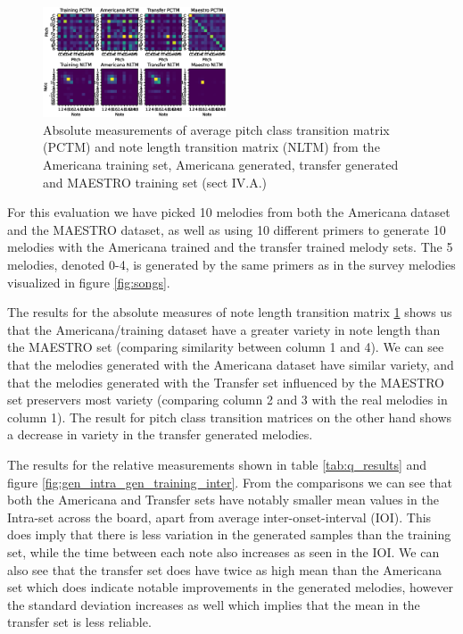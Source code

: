 \documentclass{IEEEtran}
\begin{document}
\begin{figure}
    \centering
    \includegraphics[width=0.485\textwidth]{PCTMNLTM.eps}
    \caption{
        Absolute measurements of average pitch class transition matrix
        (PCTM) and note length transition matrix (NLTM) from the Americana
        training set, Americana generated, transfer generated and MAESTRO
        training set (sect IV.A.)
        \label{fig:absoluteNLTMPCTM}
    }
\end{figure}

For this evaluation we have picked 10 melodies from both the Americana
dataset and the MAESTRO dataset, as well as using 10 different primers to
generate 10 melodies with the Americana trained and the transfer trained
melody sets. The 5 melodies, denoted 0-4, is generated by the same primers as in
the survey melodies visualized in figure \ref{fig:songs}.

The results for the absolute measures of note length transition matrix
\ref{fig:absoluteNLTMPCTM} shows us that the Americana/training dataset have
a greater variety in note length than the MAESTRO set (comparing similarity 
between column 1 and 4). We can see that the
melodies generated with the Americana dataset have similar variety, and that
the melodies generated with the Transfer set influenced by the MAESTRO set preservers
most variety (comparing column 2 and 3 with the real melodies in column 1). 
The result for pitch class transition matrices on the other
hand shows a decrease in variety in the transfer generated melodies.

The results for the relative measurements shown in table \ref{tab:q_results}
and figure \ref{fig:gen_intra_gen_training_inter}. From the comparisons we
can see that both the Americana and Transfer sets have notably smaller mean
values in the Intra-set across the board, apart from average
inter-onset-interval (IOI). This does imply that there is less variation in
the generated samples than the training set, while the time between each note
also increases as seen in the IOI. We can also see that the transfer set does
have twice as high mean than the Americana set which does indicate notable
improvements in the generated melodies, however the standard deviation
increases as well which implies that the mean in the transfer set is less
reliable.
\end{document}
